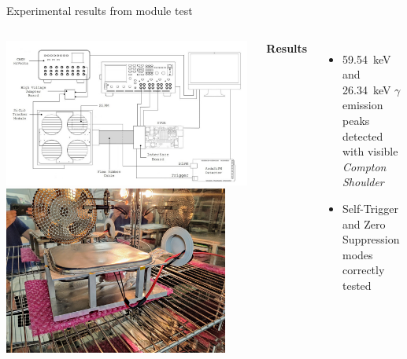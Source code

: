 \documentclass[aspectratio=169,xcolor=dvipsnames,handout]{beamer} %
\newcommand{\greencheck}{{\color{ForestGreen}\checkmark}}
\begin{document}
\begin{frame}{Experimental results from module test}
\begin{columns}
            \begin{columns}
                    \includegraphics[width=0.99\textwidth]{images/muon_detection/test_setup_MODULE.jpg}
                    \includegraphics[width=0.9\textwidth]{images/muon_detection/foto_modulo_camera.jpg}
            \end{columns}

            \fontsize{10pt}{1}\selectfont
            \textbf{Results} \\
            \vspace{0.05cm}

            \fontsize{8.5pt}{1}\selectfont
            \begin{itemize}
                \item \SI{59.54}{\kilo\electronvolt} and \SI{26.34}{\kilo\electronvolt}  $\gamma$ emission peaks detected with visible \textit{Compton Shoulder} \greencheck
                \item Self-Trigger and Zero Suppression modes correctly tested \greencheck
            \end{itemize}


\end{columns}
\end{frame}
\end{document}
